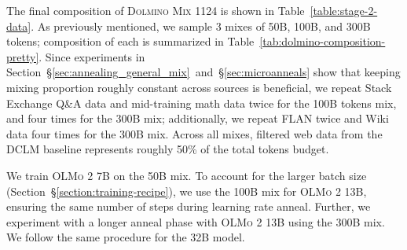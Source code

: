 \documentclass[table]{ai2style/ai2}
\newcommand{\olmotoo}{\textsc{OLMo 2}\xspace}
\newcommand{\dolminos}{\textsc{Dolmino Mix 1124}\xspace}
\begin{document}
The final composition of \dolminos is shown in Table~\ref{table:stage-2-data}. 
As previously mentioned, we sample 3 mixes of 50B, 100B, and 300B tokens; 
composition of each is summarized in Table~\ref{tab:dolmino-composition-pretty}.
Since experiments in Section~\S\ref{sec:annealing_general_mix}~and~\S\ref{sec:microanneals} show that keeping mixing proportion roughly constant across sources is beneficial, we repeat Stack Exchange Q\&A data and mid-training math data twice for the 100B tokens mix, and four times for the 300B mix;
additionally, we repeat FLAN twice and Wiki data four times for the 300B mix.
Across all mixes, filtered web data from the DCLM baseline represents roughly 50\% of the total tokens budget.
 
We train \olmotoo 7B on the 50B mix.
To account for the larger batch size (Section~\S\ref{section:training-recipe}), we use the 100B mix for \olmotoo 13B, ensuring the same number of steps during learning rate anneal. 
Further, we experiment with a longer anneal phase with \olmotoo 13B using the 300B mix.
We follow the same procedure for the 32B model.
\end{document}
